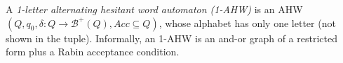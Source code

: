 %
%


A \emph{1-letter alternating hesitant word automaton (1-AHW)} is
an AHW $(Q, q_0, \delta: Q \to \mathcal{B}^+(Q), Acc \subseteq Q)$,
whose alphabet has only one letter (not shown in the tuple).
Informally,
an 1-AHW is an and-or graph of a restricted form
plus a Rabin acceptance condition.

%
%

